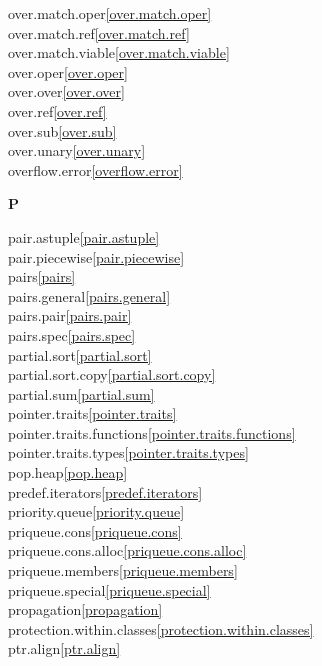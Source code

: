 \begin{multicols}{2}
over.match.oper\quad\ref{over.match.oper}\\
over.match.ref\quad\ref{over.match.ref}\\
over.match.viable\quad\ref{over.match.viable}\\
over.oper\quad\ref{over.oper}\\
over.over\quad\ref{over.over}\\
over.ref\quad\ref{over.ref}\\
over.sub\quad\ref{over.sub}\\
over.unary\quad\ref{over.unary}\\
overflow.error\quad\ref{overflow.error}\\
\par \textbf{P}\par
pair.astuple\quad\ref{pair.astuple}\\
pair.piecewise\quad\ref{pair.piecewise}\\
pairs\quad\ref{pairs}\\
pairs.general\quad\ref{pairs.general}\\
pairs.pair\quad\ref{pairs.pair}\\
pairs.spec\quad\ref{pairs.spec}\\
partial.sort\quad\ref{partial.sort}\\
partial.sort.copy\quad\ref{partial.sort.copy}\\
partial.sum\quad\ref{partial.sum}\\
pointer.traits\quad\ref{pointer.traits}\\
pointer.traits.functions\quad\ref{pointer.traits.functions}\\
pointer.traits.types\quad\ref{pointer.traits.types}\\
pop.heap\quad\ref{pop.heap}\\
predef.iterators\quad\ref{predef.iterators}\\
priority.queue\quad\ref{priority.queue}\\
priqueue.cons\quad\ref{priqueue.cons}\\
priqueue.cons.alloc\quad\ref{priqueue.cons.alloc}\\
priqueue.members\quad\ref{priqueue.members}\\
priqueue.special\quad\ref{priqueue.special}\\
propagation\quad\ref{propagation}\\
protection.within.classes\quad\ref{protection.within.classes}\\
ptr.align\quad\ref{ptr.align}\\

\end{multicols}
